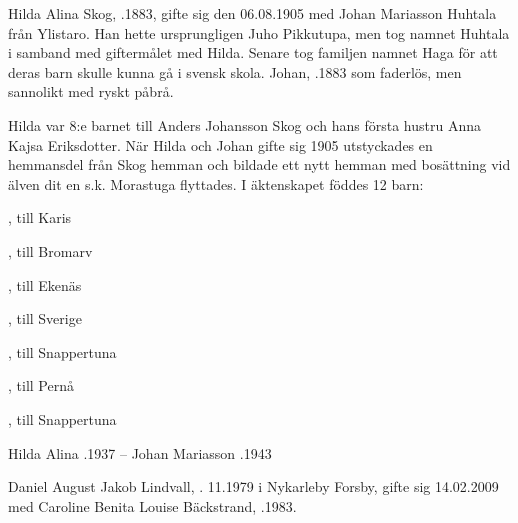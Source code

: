 Hilda Alina Skog, .1883, gifte sig den 06.08.1905 med Johan Mariasson Huhtala från Ylistaro. Han hette ursprungligen Juho Pikkutupa, men tog namnet Huhtala i samband med giftermålet med Hilda. Senare tog familjen namnet Haga för att deras barn skulle kunna gå i svensk skola. Johan, .1883 som faderlös, men sannolikt med ryskt påbrå.

Hilda var 8:e barnet till Anders Johansson Skog och hans första hustru Anna Kajsa Eriksdotter. När Hilda och Johan gifte sig 1905 utstyckades en hemmansdel från Skog hemman och bildade ett nytt hemman med bosättning vid älven dit en s.k. Morastuga flyttades. I äktenskapet föddes 12 barn:
\begin{jhchildren}
  \item {}
  \item {}
  \item {}
  \item {}, till Karis
  \item {}
  \item {}, till Bromarv
  \item {}, till Ekenäs
  \item {}, till Sverige
  \item {}, till Snappertuna
  \item {}
  \item {}, till Pernå
  \item {}, till Snappertuna
\end{jhchildren}

Hilda Alina .1937  --   Johan Mariasson .1943




Daniel August Jakob Lindvall, . 11.1979 i Nykarleby Forsby, gifte sig 14.02.2009 med Caroline Benita Louise Bäckstrand, .1983.



